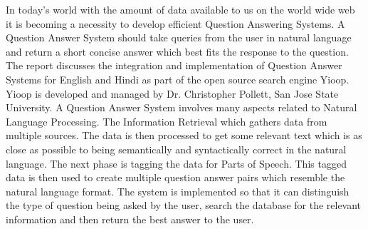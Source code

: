 In today's world with the amount of data available to us on the world wide web it is becoming a necessity to develop efficient Question Answering Systems. A Question Answer System should take queries from the user in natural language and return a short concise answer which best fits the response to the question. The report discusses the integration and implementation of Question Answer Systems for English and Hindi as part of the  open source search engine Yioop. Yioop is developed and managed by Dr. Christopher Pollett, San Jose State University.  A Question  Answer System involves  many aspects related to Natural Language Processing.  The Information Retrieval which gathers data from multiple sources. The data is then processed to get some relevant text which is as close as possible to being semantically and syntactically correct in the natural language. The next phase is  tagging the data for Parts of Speech. This tagged data is then used to create multiple question answer pairs which resemble the natural language format. The system is implemented so that it can distinguish the type of question being asked by the user, search the database for the relevant information and then return the best answer to the user.

